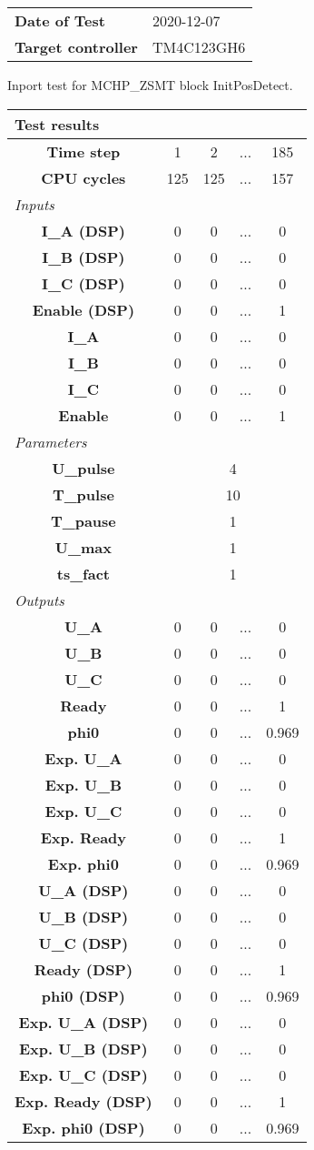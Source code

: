 \begin{tabular}{l l}
\textbf{Date of Test} & 2020-12-07 \tabularnewline
\textbf{Target controller} & TM4C123GH6 \tabularnewline
\end{tabular}
\vspace{1ex}
Inport test for MCHP_ZSMT block InitPosDetect.

\vspace{1em}
\begin{tabularx}{\textwidth}{|c|c|c|>{\centering\arraybackslash}X|c|}
\hline
\multicolumn{5}{|l|}{\cellcolor[gray]{0.8}\textbf{Test results}} \tabularnewline \hline
\textbf{Time step} & 1 & 2 & ... & 185 \tabularnewline \hline
\textbf{CPU cycles} & 125 & 125 & ... & 157 \tabularnewline \hline
\multicolumn{5}{|l|}{\cellcolor[gray]{0.9}\textit{Inputs}} \tabularnewline \hline
\textbf{I\_A (DSP)} & 0 & 0 & ... & 0 \tabularnewline \hline
\textbf{I\_B (DSP)} & 0 & 0 & ... & 0 \tabularnewline \hline
\textbf{I\_C (DSP)} & 0 & 0 & ... & 0 \tabularnewline \hline
\textbf{Enable (DSP)} & 0 & 0 & ... & 1 \tabularnewline \hline
\textbf{I\_A} & 0 & 0 & ... & 0 \tabularnewline \hline
\textbf{I\_B} & 0 & 0 & ... & 0 \tabularnewline \hline
\textbf{I\_C} & 0 & 0 & ... & 0 \tabularnewline \hline
\textbf{Enable} & 0 & 0 & ... & 1 \tabularnewline \hline
\multicolumn{5}{|l|}{\cellcolor[gray]{0.9}\textit{Parameters}} \tabularnewline \hline
\textbf{U\_pulse} & \multicolumn{4}{c|}{4} \tabularnewline \hline
\textbf{T\_pulse} & \multicolumn{4}{c|}{10} \tabularnewline \hline
\textbf{T\_pause} & \multicolumn{4}{c|}{1} \tabularnewline \hline
\textbf{U\_max} & \multicolumn{4}{c|}{1} \tabularnewline \hline
\textbf{ts\_fact} & \multicolumn{4}{c|}{1} \tabularnewline \hline
\multicolumn{5}{|l|}{\cellcolor[gray]{0.9}\textit{Outputs}} \tabularnewline \hline
\textbf{U\_A} & 0 & 0 & ... & 0 \tabularnewline \hline
\textbf{U\_B} & 0 & 0 & ... & 0 \tabularnewline \hline
\textbf{U\_C} & 0 & 0 & ... & 0 \tabularnewline \hline
\textbf{Ready} & 0 & 0 & ... & 1 \tabularnewline \hline
\textbf{phi0} & 0 & 0 & ... & 0.969 \tabularnewline \hline
\textbf{Exp. U\_A} & 0 & 0 & ... & 0 \tabularnewline \hline
\textbf{Exp. U\_B} & 0 & 0 & ... & 0 \tabularnewline \hline
\textbf{Exp. U\_C} & 0 & 0 & ... & 0 \tabularnewline \hline
\textbf{Exp. Ready} & 0 & 0 & ... & 1 \tabularnewline \hline
\textbf{Exp. phi0} & 0 & 0 & ... & 0.969 \tabularnewline \hline
\textbf{U\_A (DSP)} & 0 & 0 & ... & 0 \tabularnewline \hline
\textbf{U\_B (DSP)} & 0 & 0 & ... & 0 \tabularnewline \hline
\textbf{U\_C (DSP)} & 0 & 0 & ... & 0 \tabularnewline \hline
\textbf{Ready (DSP)} & 0 & 0 & ... & 1 \tabularnewline \hline
\textbf{phi0 (DSP)} & 0 & 0 & ... & 0.969 \tabularnewline \hline
\textbf{Exp. U\_A (DSP)} & 0 & 0 & ... & 0 \tabularnewline \hline
\textbf{Exp. U\_B (DSP)} & 0 & 0 & ... & 0 \tabularnewline \hline
\textbf{Exp. U\_C (DSP)} & 0 & 0 & ... & 0 \tabularnewline \hline
\textbf{Exp. Ready (DSP)} & 0 & 0 & ... & 1 \tabularnewline \hline
\textbf{Exp. phi0 (DSP)} & 0 & 0 & ... & 0.969 \tabularnewline \hline
\end{tabularx}
\vspace{1ex}

